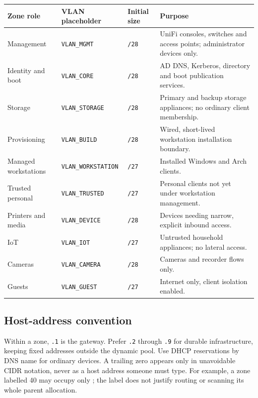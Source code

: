 \begin{tabularx}{\linewidth}{@{}p{.18\linewidth}p{.17\linewidth}p{.20\linewidth}L@{}}
\toprule
\textbf{Zone role} & \textbf{VLAN placeholder} & \textbf{Initial size} & \textbf{Purpose}\\
\midrule
Management & \texttt{VLAN\_MGMT} & \texttt{/28} & UniFi consoles, switches and access points; administrator devices only.\\
Identity and boot & \texttt{VLAN\_CORE} & \texttt{/28} & AD DNS, Kerberos, directory and boot publication services.\\
Storage & \texttt{VLAN\_STORAGE} & \texttt{/28} & Primary and backup storage appliances; no ordinary client membership.\\
Provisioning & \texttt{VLAN\_BUILD} & \texttt{/28} & Wired, short-lived workstation installation boundary.\\
Managed workstations & \texttt{VLAN\_WORKSTATION} & \texttt{/27} & Installed Windows and Arch clients.\\
Trusted personal & \texttt{VLAN\_TRUSTED} & \texttt{/27} & Personal clients not yet under workstation management.\\
Printers and media & \texttt{VLAN\_DEVICE} & \texttt{/28} & Devices needing narrow, explicit inbound access.\\
IoT & \texttt{VLAN\_IOT} & \texttt{/27} & Untrusted household appliances; no lateral access.\\
Cameras & \texttt{VLAN\_CAMERA} & \texttt{/28} & Cameras and recorder flows only.\\
Guests & \texttt{VLAN\_GUEST} & \texttt{/27} & Internet only, client isolation enabled.\\
\bottomrule
\end{tabularx}

\subsection*{Host-address convention}
Within a zone, \texttt{.1} is the gateway.  Prefer \texttt{.2} through
\texttt{.9} for durable infrastructure, keeping fixed addresses outside the
dynamic pool.  Use DHCP reservations by DNS name for ordinary devices.
A trailing zero appears only in unavoidable CIDR notation, never as a host
address someone must type.  For example, a zone labelled 40 may occupy only
; the label does not justify routing or scanning its
whole parent allocation.

